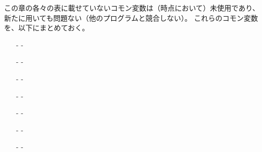 \clearpage
この章の各々の表に載せていないコモン変数は（\dateUnusedVariables 時点において）未使用であり、新たに用いても問題ない（他のプログラムと競合しない）。
これらのコモン変数を、以下にまとめておく。
\begin{enumerate}
\item[-] -
\item[-] -
\item[-] -
\item[-] -
\item[-] -
\item[-] -
\item[-] -
\end{enumerate}
